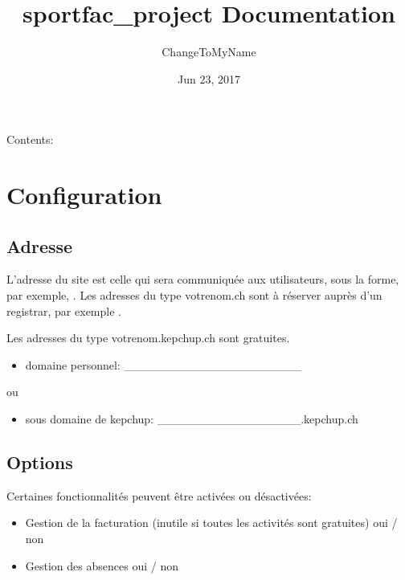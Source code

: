 \documentclass[letterpaper,10pt,english]{sphinxmanual}
\title{sportfac_project Documentation}
\date{Jun 23, 2017}
\author{ChangeToMyName}
\begin{document}
\maketitle
\sphinxtableofcontents
{}\label{\detokenize{index::doc}}


Contents:


\chapter{Configuration}
\label{\detokenize{configurer:welcome-to-sportfac-project-s-documentation}}\label{\detokenize{configurer:configuration}}\label{\detokenize{configurer::doc}}
\noindent{}


\section{Adresse}
\label{\detokenize{configurer:adresse}}
L’adresse du site est celle qui sera communiquée aux utilisateurs, sous la forme, par exemple, .
Les adresses du type votrenom.ch sont à réserver auprès d’un registrar, par exemple .

Les adresses du type votrenom.kepchup.ch sont gratuites.
\begin{itemize}
\item {} 
domaine personnel: \_\_\_\_\_\_\_\_\_\_\_\_\_\_\_\_\_\_\_\_\_

\end{itemize}

ou
\begin{itemize}
\item {} 
sous domaine de kepchup: \_\_\_\_\_\_\_\_\_\_\_\_\_\_\_\_\_.kepchup.ch

\end{itemize}


\section{Options}
\label{\detokenize{configurer:options}}
Certaines fonctionnalités peuvent être activées ou désactivées:
\begin{itemize}
\item {} 
Gestion de la facturation (inutile si toutes les activités sont gratuites) oui / non

\item {} 
Gestion des absences oui / non

\end{itemize}
\end{document}

